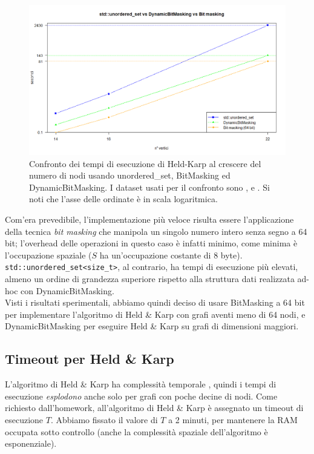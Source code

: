 \begin{figure}[h]
	\centering
	\includegraphics[width=1\textwidth]{./images/unorderedSet vs BitMasking.png}
	\caption{Confronto dei tempi di esecuzione di Held-Karp al crescere del numero di nodi usando unordered\_set, BitMasking ed DynamicBitMasking. I dataset usati per il confronto sono ,  e . Si noti che l'asse delle ordinate è in scala logaritmica.}
	\label{fig:UnorderedvsDynamicBitMasking}
\end{figure}

\noindent Com'era prevedibile, l'implementazione più veloce risulta essere l'applicazione della tecnica \textit{bit masking} che manipola un singolo numero intero senza segno a 64 bit; l'overhead delle operazioni in questo caso è infatti minimo, come minima è l'occupazione spaziale ($S$ ha un'occupazione costante di 8 byte). \\

\noindent \texttt{std::unordered_set<size_t>}, al contrario, ha tempi di esecuzione più elevati, almeno un ordine di grandezza superiore rispetto alla struttura dati realizzata ad-hoc con DynamicBitMasking. \\

\noindent Visti i risultati sperimentali, abbiamo quindi deciso di usare BitMasking a 64 bit per implementare l'algoritmo di Held \& Karp con grafi aventi meno di 64 nodi, e DynamicBitMasking per eseguire Held \& Karp su grafi di dimensioni maggiori.

\subsection{Timeout per Held \& Karp}

\noindent L'algoritmo di Held \& Karp ha complessità temporale \complexityHeldKarpTime{}, quindi i tempi di esecuzione \textit{esplodono} anche solo per grafi con poche decine di nodi. Come richiesto dall'homework, all'algoritmo di Held \& Karp è assegnato un timeout di esecuzione $T$. Abbiamo fissato il valore di $T$ a 2 minuti, per mantenere la RAM occupata sotto controllo (anche la complessità spaziale dell'algoritmo è esponenziale).\\

